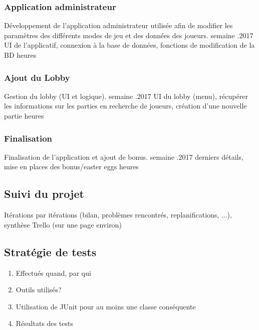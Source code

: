\documentclass[a4paper,11pt]{article}
\begin{document}
	\subsubsection{Application administrateur}
	\begin{enumerate}[labelwidth=5em,leftmargin=8em]
		\objectif Développement de l'application administrateur utilisée afin de modifier les paramètres des différents modes de jeu et des données des joueurs.
		 semaine
		.2017
		\partageTache UI de l'applicatif, connexion à la base de données, fonctions de modification de la BD
		 heures
	\end{enumerate}

	\subsubsection{Ajout du Lobby}
	\begin{enumerate}[labelwidth=5em,leftmargin=8em]
		\objectif Gestion du lobby (UI et logique).
		 semaine
		.2017
		\partageTache UI du lobby (menu), récupérer les informations sur les parties en recherche de joueurs, création d'une nouvelle partie
		 heures
	\end{enumerate}

	\subsubsection{Finalisation}
	\begin{enumerate}[labelwidth=5em,leftmargin=8em]
		\objectif Finalisation de l'application et ajout de bonus.
		 semaine
		.2017
		\partageTache derniers détails, mise en places des bonus/easter eggs
		 heures
	\end{enumerate}

	
	\subsection{Suivi du projet}
	Itérations par itérations (bilan, problèmes rencontrés, replanifications, ...), synthèse Trello (sur une page environ)
	
	\subsection{Stratégie de tests}
	\begin{enumerate}
		\item Effectués quand, par qui
		\item Outils utilisés?
		\item Utilisation de JUnit pour au moins une classe conséquente
		\item Résultats des tests
	\end{enumerate}
\end{document}
